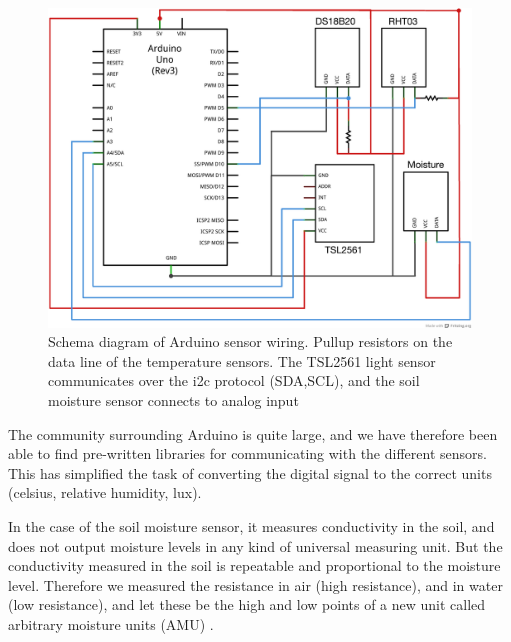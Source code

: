 
\begin{figure}
\centering
\includegraphics[width=1\textwidth]{img/hardware/Arduino_and_sensors_schem.png}
\caption{Schema diagram of Arduino sensor wiring. Pullup resistors on the data line of the temperature sensors. The TSL2561 light sensor communicates over the i2c protocol (SDA,SCL), and the soil moisture sensor connects to analog input}
\label{fig:Arduino}
\end{figure}

The community surrounding Arduino is quite large, and we have therefore been able to find pre-written libraries for communicating with the different sensors. This has simplified the task of converting the digital signal to the correct units (celsius, relative humidity, lux). 

In the case of the soil moisture sensor, it measures conductivity in the soil, and does not output moisture levels in any kind of universal measuring unit. But the conductivity measured in the soil is repeatable and proportional to the moisture level. Therefore we measured the resistance in air (high resistance), and in water (low resistance), and let these be the high and low points of a new unit called arbitrary moisture units (AMU) \citep{ch00ftech}.

